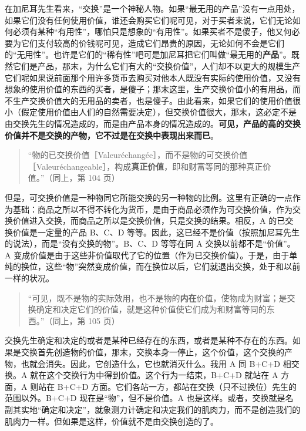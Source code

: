 在加尼耳先生看来，“交换”是一个神秘人物。如果“最无用的产品”没有一点用处，如果它们没有任何使用价值，谁还会购买它们呢可见，对于买者来说，它们无论如何必须有某种“有用性”，哪怕只是想象的“有用性”。如果买者不是傻子，他又何必要为它们支付较高的价钱呢可见，造成它们昂贵的原因，无论如何不会是它们的“无用性”。也许是它们的“稀有性”吧可是加尼耳把它们叫做“最无用的\textbf{产品}”。既然它们是产品，那末，为什么它们有大的“交换价值”，人们却不以更大的规模生产它们呢如果说前面那个用许多货币去购买对他本人既没有实际的使用价值，又没有想象的使用价值的东西的买者，是傻子；那末这里，生产交换价值小的有用品，而不生产交换价值大的无用品的卖者，也是傻子。由此看来，如果它们的使用价值很小（假定使用价值由人们的自然需要决定），但交换价值很大，那末，这必定不是由交换先生的情况造成的，而是由产品本身的情况造成的。\textbf{可见，产品的高的交换价值并不是交换的产物，它不过是在交换中表现出来而已}。

\begin{quote}“物的已交换价值［Valeuréchangée］，而不是物的可交换价值［Valeuréchangeable］，构成\textbf{真正价值}，即和财富等同的那种真正价值。”（同上，第 104 页）\end{quote}

但是，可交换价值是一种物同它所能交换的另一种物的比例。\fontbox{~\{}这里有正确的一点作为基础：商品之所以不得不转化为货币，是由于商品必须作为可交换价值，作为交换价值进入交换，而商品之所以是交换价值，只是交换的结果。\fontbox{\}~}相反，A 的已交换价值是一定量的产品 B、C、D 等等。因此，这已经不是价值（按照加尼耳先生的说法），而是“没有交换的物”。B、C、D 等等在同 A 交换以前都不是“价值”。A 变成价值是由于这些非价值取代了它的位置（作为已交换价值）。于是，由于单纯的换位，这些“物”突然变成价值，而在换位以后，它们就退出交换，处于和以前一样的状况。

\begin{quote}“可见，既不是物的实际效用，也不是物的\textbf{内在}价值，使物成为财富；是交换确定和决定它们的价值，就是这种价值使它们成为和财富等同的东西。”（同上，第 105 页）\end{quote}

交换先生确定和决定的或者是某种已经存在的东西，或者是某种不存在的东西。如果是交换首先创造物的价值，那末，交换本身一停止，这个价值，这个交换的产物，也就会消失。因此，它创造什么，它也就消灭什么。我用 A 同 B+C+D 相交换。A 就在这个交换行为中得到价值。这个行为一结束，B+C+D 就站在 A 方面，A 则站在 B+C+D 方面。它们各站一方，都站在交换（只不过换位）先生的范围以外。B+C+D 现在是“物”，但不是价值。A 也是这样。或者，交换就是名副其实地“确定和决定”，就象测力计确定和决定我们的肌肉力，而不是创造我们的肌肉力一样。但如果是这样，价值就不是由交换创造的了。

